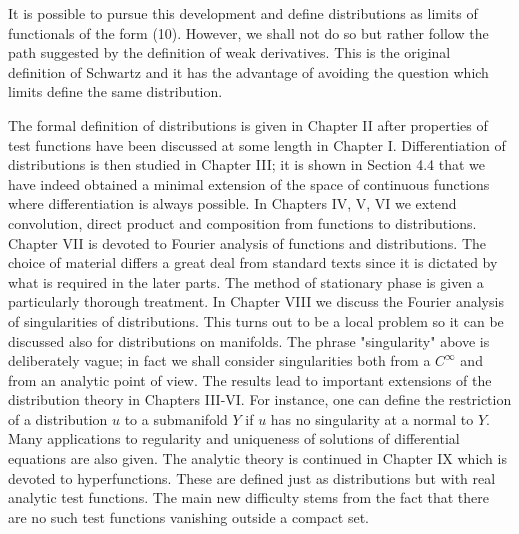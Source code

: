 It is possible to pursue this development and define distributions as limits of functionals of the form (10). However, we shall not do so but rather follow the path suggested by the definition of weak derivatives. This is the original definition of Schwartz and it has the advantage of avoiding the question which limits define the same distribution.

The formal definition of distributions is given in Chapter II after properties of test functions have been discussed at some length in Chapter I. Differentiation of distributions is then studied in Chapter III; it is shown in Section 4.4 that we have indeed obtained a minimal extension of the space of continuous functions where differentiation is always possible. In Chapters IV, V, VI we extend convolution, direct product and composition from functions to distributions. Chapter VII is devoted to Fourier analysis of functions and distributions. The choice of material differs a great deal from standard texts since it is dictated by what is required in the later parts. The method of stationary phase is given a particularly thorough treatment. In Chapter VIII we discuss the Fourier analysis of singularities of distributions. This turns out to be a local problem so it can be discussed also for distributions on manifolds. The phrase "singularity" above is deliberately vague; in fact we shall consider singularities both from a $C^{\infty}$ and from an analytic point of view. The results lead to important extensions of the distribution theory in Chapters III-VI. For instance, one can define the restriction of a distribution $u$ to a submanifold $Y$ if $u$ has no singularity at a normal to $Y$. Many applications to regularity and uniqueness of solutions of differential equations are also given. The analytic theory is continued in Chapter IX which is devoted to hyperfunctions. These are defined just as distributions but with real analytic test functions. The main new difficulty stems from the fact that there are no such test functions vanishing outside a compact set.